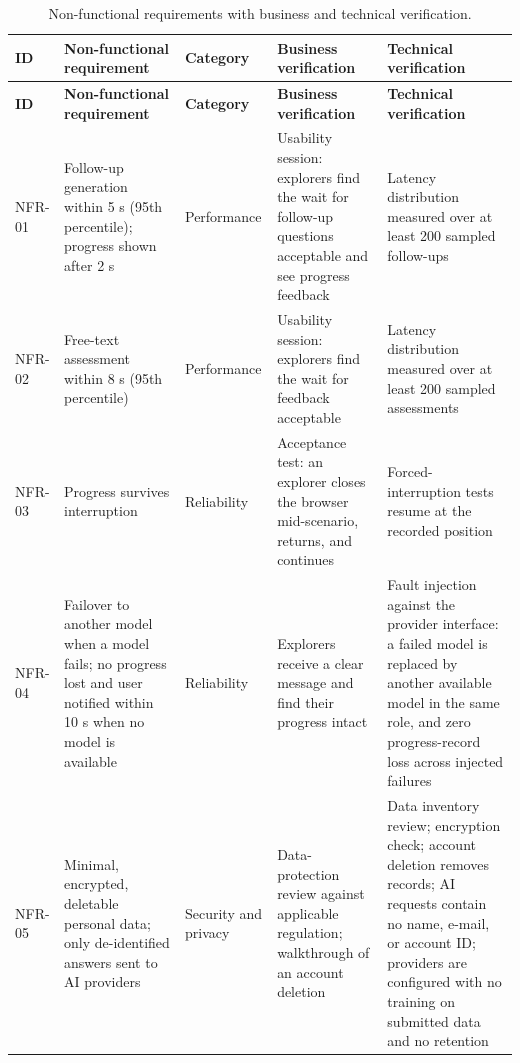{\small{}\renewcommand{\arraystretch}{1.1}
\begin{longtable}{|>{\raggedright\arraybackslash}p{}|>{\raggedright\arraybackslash}p{}|>{\raggedright\arraybackslash}p{}|>{\raggedright\arraybackslash}p{}|>{\raggedright\arraybackslash}p{}|}
\caption{Non-\allowbreak{}functional requirements with business and technical verification.} \\
\hline
\textbf{ID} & \textbf{Non-\allowbreak{}functional requirement} & \textbf{Category} & \textbf{Business verification} & \textbf{Technical verification} \\ \hline
\endfirsthead
\hline
\textbf{ID} & \textbf{Non-\allowbreak{}functional requirement} & \textbf{Category} & \textbf{Business verification} & \textbf{Technical verification} \\ \hline
\endhead
NFR-01 & Follow-up generation within 5 s (95th percentile); progress shown after 2 s & Performance & Usability session: explorers find the wait for follow-up questions acceptable and see progress feedback & Latency distribution measured over at least 200 sampled follow-ups \\ \hline
NFR-02 & Free-text assessment within 8 s (95th percentile) & Performance & Usability session: explorers find the wait for feedback acceptable & Latency distribution measured over at least 200 sampled assessments \\ \hline
NFR-03 & Progress survives interruption & Reliability & Acceptance test: an explorer closes the browser mid-\allowbreak{}scenario, returns, and continues & Forced-\allowbreak{}interruption tests resume at the recorded position \\ \hline
NFR-04 & Failover to another model when a model fails; no progress lost and user notified within 10 s when no model is available & Reliability & Explorers receive a clear message and find their progress intact & Fault injection against the provider interface: a failed model is replaced by another available model in the same role, and zero progress-\allowbreak{}record loss across injected failures \\ \hline
NFR-05 & Minimal, encrypted, deletable personal data; only de-\allowbreak{}identified answers sent to AI providers & Security and privacy & Data-\allowbreak{}protection review against applicable regulation; walkthrough of an account deletion & Data inventory review; encryption check; account deletion removes records; AI requests contain no name, e-mail, or account ID; providers are configured with no training on submitted data and no retention \\ \hline

\end{longtable}}
